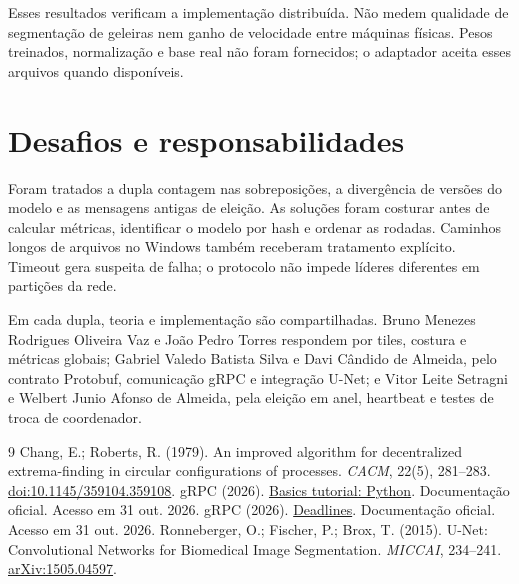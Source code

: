 \documentclass[12pt]{article}
\begin{document}
Esses resultados verificam a implementação distribuída. Não medem qualidade de segmentação de geleiras nem ganho de velocidade entre máquinas físicas. Pesos treinados, normalização e base real não foram fornecidos; o adaptador aceita esses arquivos quando disponíveis.

\section{Desafios e responsabilidades}
Foram tratados a dupla contagem nas sobreposições, a divergência de versões do modelo e as mensagens antigas de eleição. As soluções foram costurar antes de calcular métricas, identificar o modelo por hash e ordenar as rodadas. Caminhos longos de arquivos no Windows também receberam tratamento explícito. Timeout gera suspeita de falha; o protocolo não impede líderes diferentes em partições da rede.

Em cada dupla, teoria e implementação são compartilhadas. Bruno Menezes Rodrigues Oliveira Vaz e João Pedro Torres respondem por tiles, costura e métricas globais; Gabriel Valedo Batista Silva e Davi Cândido de Almeida, pelo contrato Protobuf, comunicação gRPC e integração U-Net; e Vitor Leite Setragni e Welbert Junio Afonso de Almeida, pela eleição em anel, heartbeat e testes de troca de coordenador.

\begin{thebibliography}{9}
\small
{} Chang, E.; Roberts, R. (1979). An improved algorithm for decentralized extrema-finding in circular configurations of processes. \textit{CACM}, 22(5), 281--283. \href{https://doi.org/10.1145/359104.359108}{doi:10.1145/359104.359108}.
 gRPC (2026). \href{https://grpc.io/docs/languages/python/basics/}{Basics tutorial: Python}. Documentação oficial. Acesso em 31 out. 2026.
 gRPC (2026). \href{https://grpc.io/docs/guides/deadlines/}{Deadlines}. Documentação oficial. Acesso em 31 out. 2026.
 Ronneberger, O.; Fischer, P.; Brox, T. (2015). U-Net: Convolutional Networks for Biomedical Image Segmentation. \textit{MICCAI}, 234--241. \href{https://arxiv.org/abs/1505.04597}{arXiv:1505.04597}.
\end{thebibliography}
\end{document}
